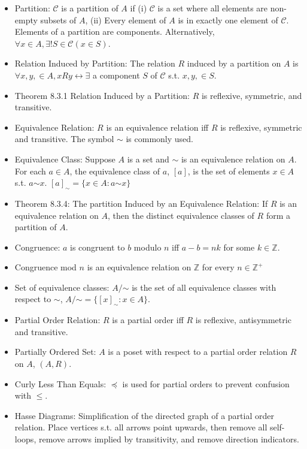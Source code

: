 \documentclass[10pt, portrait]{article}
\renewcommand{\lnot}{\mathord{\sim}}
\begin{document}
\begin{multicols*}{2}
\begin{itemize}
    \item Partition: $\mathscr{C}$ is a partition of $A$ if (i) $\mathscr{C}$ is a set where all elements are non-empty subsets of $A$, (ii) Every element of $A$ is in exactly one element of $\mathscr{C}$. Elements of a partition are components. Alternatively, $\forall x \in A, \exists ! S \in \mathscr{C} (x \in S)$.
    \item Relation Induced by Partition: The relation $R$ induced by a partition on $A$ is $\forall x, y, \in A, x R y \leftrightarrow \exists$ a component $S$ of $\mathscr{C}$ s.t. $x, y, \in S$.
    \item Theorem 8.3.1 Relation Induced by a Partition: $R$ is reflexive, symmetric, and transitive.
    \item Equivalence Relation: $R$ is an equivalence relation iff $R$ is reflexive, symmetric and transitive. The symbol $\lnot$ is commonly used.
    \item Equivalence Class: Suppose $A$ is a set and $\lnot$ is an equivalence relation on $A$. For each $a \in A$, the equivalence class of $a$, $[a]$, is the set of elements $x \in A$ s.t. $a \lnot x$. $[a]_{\lnot} = \{x \in A : a \lnot x\}$
    \item Theorem 8.3.4: The partition Induced by an Equivalence Relation: If $R$ is an equivalence relation on $A$, then the distinct equivalence classes of $R$ form a partition of $A$.
    \item Congruence: $a$ is congruent to $b$ modulo $n$ iff $a-b = nk$ for some $k \in \mathbb{Z}$.
    \item Congruence mod $n$ is an equivalence relation on $\mathbb{Z}$ for every $n \in \mathbb{Z}^+$
    \item Set of equivalence classes: $A / \lnot$ is the set of all equivalence classes with respect to $\lnot$, $A / \lnot = \{[x]_{\lnot} : x \in A\}$.
    \item Partial Order Relation: $R$ is a partial order iff $R$ is reflexive, antisymmetric and transitive.
    \item Partially Ordered Set: $A$ is a poset with respect to a partial order relation $R$ on $A$, $(A, R)$.
    \item Curly Less Than Equals: $\preccurlyeq$ is used for partial orders to prevent confusion with $\leq$.
    \item Hasse Diagrams: Simplification of the directed graph of a partial order relation. Place vertices s.t. all arrows point upwards, then remove all self-loops, remove arrows implied by transitivity, and remove direction indicators.

\end{itemize}
\end{multicols*}
\end{document}
